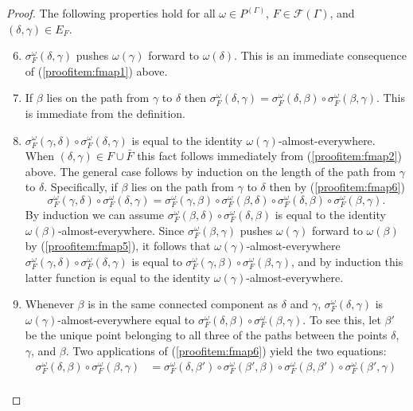 \documentclass[12pt]{amsart}
\theoremstyle{definition}
\def\cal{\mathcal}
\begin{document}
\begin{proof}
	The following properties hold for all $\omega \in P^{(\Gamma)}$, $F \in \cal F(\Gamma)$, and $(\delta, \gamma) \in E_F$.
	\begin{enumerate}\setcounter{enumi}{5}
		\item \label{proofitem:fmap5} $\sigma_F^\omega(\delta, \gamma)$ pushes $\omega(\gamma)$ forward to $\omega(\delta)$. This is an immediate consequence of (\ref{proofitem:fmap1}) above.
		\item \label{proofitem:fmap6} If $\beta$ lies on the path from $\gamma$ to $\delta$ then $\sigma_F^\omega(\delta, \gamma) = \sigma_F^\omega(\delta, \beta) \circ \sigma_F^\omega(\beta, \gamma)$. This is immediate from the definition.
		\item \label{proofitem:fmap7} $\sigma_F^\omega(\gamma, \delta) \circ \sigma_F^\omega(\delta, \gamma)$ is equal to the identity $\omega(\gamma)$-almost-everywhere. When $(\delta, \gamma) \in F \cup \bar F$ this fact follows immediately from (\ref{proofitem:fmap2}) above. The general case follows by induction on the length of the path from $\gamma$ to $\delta$. Specifically, if $\beta$ lies on the path from $\gamma$ to $\delta$ then by (\ref{proofitem:fmap6})
		\[\sigma_F^\omega(\gamma, \delta) \circ \sigma_F^\omega(\delta, \gamma) = \sigma_F^\omega(\gamma, \beta) \circ \sigma_F^\omega(\beta, \delta) \circ \sigma_F^\omega(\delta, \beta) \circ \sigma_F^\omega(\beta, \gamma).\]
		By induction we can assume $\sigma_F^\omega(\beta, \delta) \circ \sigma_F^\omega(\delta, \beta)$ is equal to the identity $\omega(\beta)$-almost-everywhere. Since $\sigma_F^\omega(\beta, \gamma)$ pushes $\omega(\gamma)$ forward to $\omega(\beta)$ by (\ref{proofitem:fmap5}), it follows that $\omega(\gamma)$-almost-everywhere $\sigma_F^\omega(\gamma, \delta) \circ \sigma_F^\omega(\delta, \gamma)$ is equal to $\sigma_F^\omega(\gamma, \beta) \circ \sigma_F^\omega(\beta, \gamma)$, and by induction this latter function is equal to the identity $\omega(\gamma)$-almost-everywhere.
		\item \label{proofitem:fmap8} Whenever $\beta$ is in the same connected component as $\delta$ and $\gamma$, $\sigma_F^\omega(\delta, \gamma)$ is $\omega(\gamma)$-almost-everywhere equal to $\sigma_F^\omega(\delta, \beta) \circ \sigma_F^\omega(\beta, \gamma)$. To see this, let $\beta'$ be the unique point belonging to all three of the paths between the points $\delta$, $\gamma$, and $\beta$. Two applications of (\ref{proofitem:fmap6}) yield the two equations:
		\begin{align*}
			\sigma_F^\omega(\delta, \beta) \circ \sigma_F^\omega(\beta, \gamma) & = \sigma_F^\omega(\delta, \beta') \circ \sigma_F^\omega(\beta', \beta) \circ \sigma_F^\omega(\beta, \beta') \circ \sigma_F^\omega(\beta', \gamma)\\

\end{align*}
\end{enumerate}
\end{proof}
\end{document}
